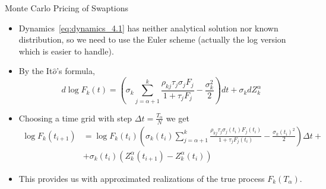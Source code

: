 \documentclass{beamer}
\begin{document}
\begin{frame}{Monte Carlo Pricing of Swaptions}
  \begin{itemize}
  \item Dynamics~\ref{eq:dynamics_4.1} has neither analytical solution nor known distribution, so we need to use the Euler scheme (actually the log version which is easier to handle).
  \item By the It$\hat{o}$’s formula,
    \begin{equation*}
      d\log F_k(t) = \left(\sigma_k\sum_{j=\alpha+1}^k\frac{\rho_{kj}\tau_j\sigma_jF_j}{1+\tau_jF_j}-\frac{\sigma_k^2}{2}\right)dt+\sigma_k dZ^\alpha_k
    \end{equation*}
  \item Choosing a time grid with step $\Delta t = \frac{T_\alpha}{N}$ we get
    \begin{equation*}
      \begin{aligned}
        \log F_k(t_{i+1}) &=\log F_k(t_i) \left(\sigma_k(t_i)\sum_{j=\alpha+1}^k\frac{\rho_{kj}\tau_j\sigma_j(t_i)F_j(t_i)}{1+\tau_jF_j(t_i)}-\frac{\sigma_k(t_i)^2}{2}\right)\Delta t + \\
        &+\sigma_k(t_i) (Z^\alpha_k(t_{i+1}) - Z^\alpha_k(t_i))
      \end{aligned}
    \end{equation*}
  \item This provides us with approximated realizations of the true process $F_k(T_\alpha)$.
  \end{itemize}
\end{frame}

\end{document}
